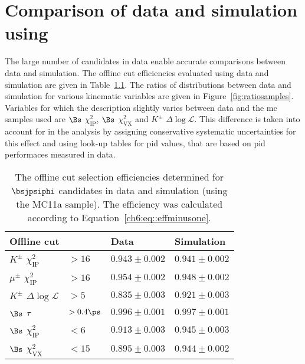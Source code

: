 \chapter{Comparison of data and simulation using \boldmath\bsjpsiphi\unboldmath}\label{appendix:datamc}
The large number of \bsjpsiphi candidates in data enable accurate comparisons between data and simulation. The offline cut efficiencies evaluated using data and simulation are given in Table~\ref{table:datamceff}. The ratios of distributions between data and simulation for various kinematic variables are given in Figure~\ref{fig:ratiosamples}. Variables for which the description slightly varies between data and the \ac{mc} samples used are $\Bs$ $\chi^2_{\mathrm{IP}}$, $\Bs$ $\chi^2_{\mathrm{VX}}$ and $K^{\pm}$ $\Delta\log\mathcal{L}$. This difference is taken into account for in the analysis by assigning conservative systematic uncertainties for this effect and using look-up tables for \ac{pid} values, that are based on \ac{pid} performaces measured in data.
\begin{table}[htb]
\caption[The offline selection efficiencies for \bsjpsiphi in data and simulation]{The offline cut selection efficiencies determined for $\bsjpsiphi$ candidates in data and simulation (using the MC11a \bsjpsiphi sample). The efficiency was calculated according to Equation~\ref{ch6:eq::effminusone}.}
\begin{center}
\begin{tabular}{|ll|l|l|}
	\hline 
	\multicolumn{2}{|l|}{Offline cut} & Data & Simulation \\%
	\hline
	$K^{\pm}$ $\chi^2_{\mathrm{IP}}$&$>16$ & $0.943\pm0.002$ & $0.941\pm0.002$\\
	$\mu^{\pm}$ $\chi^2_{\mathrm{IP}}$&$>16$ & $0.954\pm0.002$ & $0.948\pm0.002$\\ %
	$K^{\pm}$ $\Delta\log\mathcal{L}$&$>5$& $0.835\pm0.003$ & $0.921\pm0.003$\\  %
	$\Bs$ $\tau$&$>0.4\ps$ & $0.996\pm0.001$ & $0.997\pm0.001$\\	
	$\Bs$ $\chi^2_{\mathrm{IP}}$&$<6$ & $0.913\pm0.003$ & $0.945\pm0.003$\\
	$\Bs$ $\chi^2_{\mathrm{VX}}$&$<15$ & $0.895\pm0.003$ & $0.944\pm0.002$\\	
	\hline
\end{tabular}
\end{center}
\label{table:datamceff}
\end{table}
